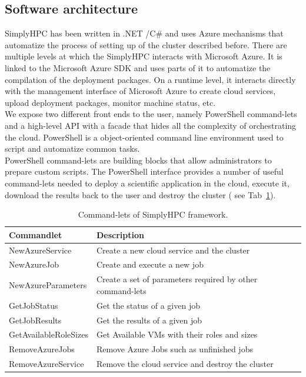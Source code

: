 \documentclass[3p,times]{elsarticle}
\begin{document}
\subsection{Software architecture}

SimplyHPC has been written in .NET  /C\# and uses Azure mechanisms that automatize the process of setting up of the cluster described before. There are multiple levels at which the SimplyHPC interacts with Microsoft Azure. It is linked to the Microsoft Azure SDK and uses parts of it to automatize the compilation of the deployment packages. On a runtime level, it interacts directly with the management interface of Microsoft Azure to create cloud services, upload deployment packages, monitor machine status, etc.\\
We expose two different front ends to the user, namely PowerShell command-lets and a high-level API with a facade that hides all the complexity of orchestrating the cloud.  PowerShell is a object-oriented command line environment used to script and automatize common tasks.\\
PowerShell command-lets are building blocks that allow administrators to prepare custom scripts. The PowerShell interface provides a number of useful command-lets needed to deploy a scientific application in the cloud, execute it, download the results back to the user and destroy the cluster ( see Tab~\ref{tab:CommandletsOfSimplyHPC}). 

\begin{table}
	\centering		
		\begin{tabular}{|l|l|}
		\hline
      \textbf{Commandlet} & \textbf{Description} \\ \hline
      NewAzureService & Create a new cloud service and the cluster \\ \hline
			NewAzureJob & Create and execute a new job \\ \hline
			NewAzureParameters & Create a set of parameters required by other command-lets    \\ \hline
			GetJobStatus & Get the status of a given job    \\ \hline
			GetJobResults & Get the results of a given job  \\ \hline
			GetAvailableRoleSizes & Get Available VMs with their roles and sizes \\ \hline
			RemoveAzureJobs & Remove Azure Jobs such as unfinished jobs \\ \hline
			RemoveAzureService & Remove the cloud service and destroy the cluster \\ \hline
    \end{tabular}
	\caption{Command-lets of SimplyHPC framework.}
	\label{tab:CommandletsOfSimplyHPC}
\end{table}
\end{document}
